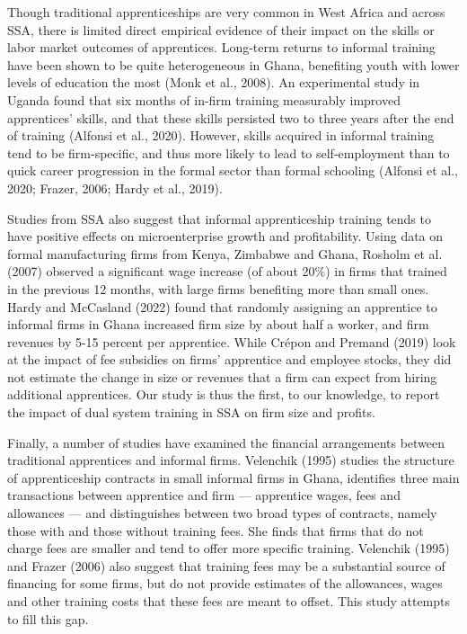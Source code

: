 \documentclass[
  11pt,
a4paper
]{report}
\begin{document}
Though traditional apprenticeships are very common in West Africa and across SSA, there is limited direct empirical evidence of their impact on the skills or labor market outcomes of apprentices. Long-term returns to informal training have been shown to be quite heterogeneous in Ghana, benefiting youth with lower levels of education the most (Monk et al., 2008). An experimental study in Uganda found that six months of in-firm training measurably improved apprentices' skills, and that these skills persisted two to three years after the end of training (Alfonsi et al., 2020). However, skills acquired in informal training tend to be firm-specific, and thus more likely to lead to self-employment than to quick career progression in the formal sector than formal schooling (Alfonsi et al., 2020; Frazer, 2006; Hardy et al., 2019).

Studies from SSA also suggest that informal apprenticeship training tends to have positive effects on microenterprise growth and profitability. Using data on formal manufacturing firms from Kenya, Zimbabwe and Ghana, Rosholm et al. (2007) observed a significant wage increase (of about 20\%) in firms that trained in the previous 12 months, with large firms benefiting more than small ones. Hardy and McCasland (2022) found that randomly assigning an apprentice to informal firms in Ghana increased firm size by about half a worker, and firm revenues by 5-15 percent per apprentice. While Crépon and Premand (2019) look at the impact of fee subsidies on firms' apprentice and employee stocks, they did not estimate the change in size or revenues that a firm can expect from hiring additional apprentices. Our study is thus the first, to our knowledge, to report the impact of dual system training in SSA on firm size and profits.

Finally, a number of studies have examined the financial arrangements between traditional apprentices and informal firms. Velenchik (1995) studies the structure of apprenticeship contracts in small informal firms in Ghana, identifies three main transactions between apprentice and firm --- apprentice wages, fees and allowances --- and distinguishes between two broad types of contracts, namely those with and those without training fees. She finds that firms that do not charge fees are smaller and tend to offer more specific training. Velenchik (1995) and Frazer (2006) also suggest that training fees may be a substantial source of financing for some firms, but do not provide estimates of the allowances, wages and other training costs that these fees are meant to offset. This study attempts to fill this gap.
\end{document}
